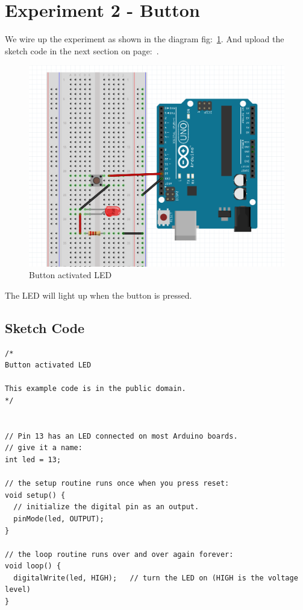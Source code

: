 \chapter*{Experiment 2 - Button}
We wire up the experiment as shown in the diagram fig:~\ref{fig:exp2_button}. And upload the sketch code in the next section on page:~\pageref{sketch:exp2}.

%
\begin{figure}[ht]
	\centering
	\includegraphics[width=12cm]{images/08}
	\caption{Button activated LED \citep{fritzing-15}}
	\label{fig:exp2_button}
\end{figure}
%

The LED will light up when the button is pressed.

\newpage
\section*{Sketch Code}
\label{sketch:exp2}
\begin{lstlisting}
/*
Button activated LED

This example code is in the public domain.
*/

 
// Pin 13 has an LED connected on most Arduino boards.
// give it a name:
int led = 13;

// the setup routine runs once when you press reset:
void setup() {                
  // initialize the digital pin as an output.
  pinMode(led, OUTPUT);     
}

// the loop routine runs over and over again forever:
void loop() {
  digitalWrite(led, HIGH);   // turn the LED on (HIGH is the voltage level)
}

\end{lstlisting}